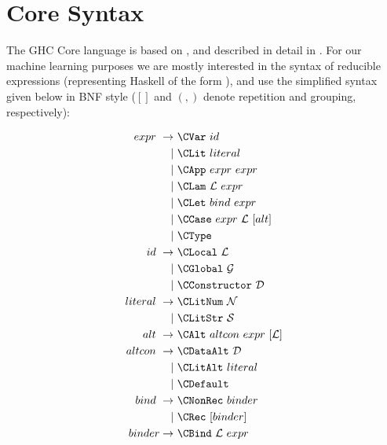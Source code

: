 \appendix

\section{Core Syntax}\label{sec:core}

The GHC Core language is based on \fc{}, and described in detail in
\cite[Appendix C]{sulzmann2007system}. For our machine learning purposes we are
mostly interested in the syntax of reducible expressions (representing Haskell
of the form ), and use the simplified syntax given below
in BNF style ($[]$ and $(,)$ denote repetition and grouping, respectively):

\begin{equation}\label{eq:coresyntax}
  \begin{split}
    expr\    \rightarrow\ & \CVar\ id                          \\
                       |\ & \CLit\ literal                     \\
                       |\ & \CApp\ expr\ expr                  \\
                       |\ & \CLam\ \mathcal{L}\ expr           \\
                       |\ & \CLet\ bind\ expr                  \\
                       |\ & \CCase\ expr\ \mathcal{L}\ [alt]   \\
                       |\ & \CType                             \\
    id\      \rightarrow\ & \CLocal\       \mathcal{L}         \\
                       |\ & \CGlobal\      \mathcal{G}         \\
                       |\ & \CConstructor\ \mathcal{D}         \\
    literal\ \rightarrow\ & \CLitNum\ \mathcal{N}              \\
                       |\ & \CLitStr\ \mathcal{S}              \\
    alt\     \rightarrow\ & \CAlt\ altcon\ expr\ [\mathcal{L}] \\
    altcon\  \rightarrow\ & \CDataAlt\ \mathcal{D}             \\
                       |\ & \CLitAlt\ literal                  \\
                       |\ & \CDefault                          \\
    bind\    \rightarrow\ & \CNonRec\ binder                   \\
                       |\ & \CRec\ [binder]                    \\
    binder   \rightarrow\ & \CBind\ \mathcal{L}\ expr
  \end{split}
\end{equation}

